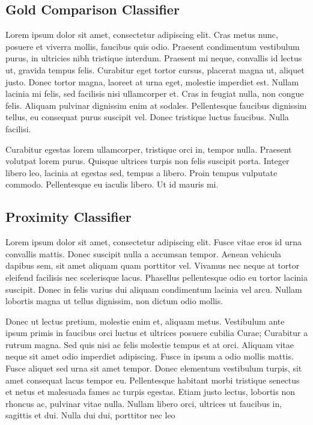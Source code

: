 \documentclass[final,5p,times,twocolumn]{elsarticle}
\begin{document}
\subsection{Gold Comparison Classifier}
\label{results:gold}

Lorem ipsum dolor sit amet, consectetur adipiscing elit. Cras metus nunc,
posuere et viverra mollis, faucibus quis odio. Praesent condimentum vestibulum
purus, in ultricies nibh tristique interdum. Praesent mi neque, convallis id
lectus ut, gravida tempus felis. Curabitur eget tortor cursus, placerat magna
ut, aliquet justo. Donec tortor magna, laoreet at urna eget, molestie imperdiet
est. Nullam lacinia mi felis, sed facilisis nisi ullamcorper et. Cras in
feugiat nulla, non congue felis. Aliquam pulvinar dignissim enim at sodales.
Pellentesque faucibus dignissim tellus, eu consequat purus suscipit vel. Donec
tristique luctus faucibus. Nulla facilisi.

Curabitur egestas lorem ullamcorper, tristique orci in, tempor nulla. Praesent
volutpat lorem purus. Quisque ultrices turpis non felis suscipit porta. Integer
libero leo, lacinia at egestas sed, tempus a libero. Proin tempus vulputate
commodo. Pellentesque eu iaculis libero. Ut id mauris mi.

\subsection{Proximity Classifier}
\label{results:proximity}

Lorem ipsum dolor sit amet, consectetur adipiscing elit. Fusce vitae eros id
urna convallis mattis. Donec suscipit nulla a accumsan tempor. Aenean vehicula
dapibus sem, sit amet aliquam quam porttitor vel. Vivamus nec neque at tortor
eleifend facilisis nec scelerisque lacus. Phasellus pellentesque odio eu tortor
lacinia suscipit. Donec in felis varius dui aliquam condimentum lacinia vel
arcu. Nullam lobortis magna ut tellus dignissim, non dictum odio mollis.

Donec ut lectus pretium, molestie enim et, aliquam metus. Vestibulum ante ipsum
primis in faucibus orci luctus et ultrices posuere cubilia Curae; Curabitur a
rutrum magna. Sed quis nisi ac felis molestie tempus et at orci. Aliquam vitae
neque sit amet odio imperdiet adipiscing. Fusce in ipsum a odio mollis mattis.
Fusce aliquet sed urna sit amet tempor. Donec elementum vestibulum turpis, sit
amet consequat lacus tempor eu. Pellentesque habitant morbi tristique senectus
et netus et malesuada fames ac turpis egestas. Etiam justo lectus, lobortis non
rhoncus ac, pulvinar vitae nulla. Nullam libero orci, ultrices ut faucibus in,
sagittis et dui. Nulla dui dui, porttitor nec leo
\end{document}

